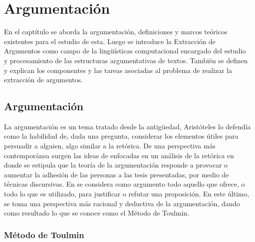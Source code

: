 \chapter{Argumentación}\label{chapter:argumentation}

En el captítulo se aborda la argumentación, definiciones y marcos teóricos existentes para el estudio de esta.
Luego se introduce la Extracción de Argumentos como campo de la lingüísticas computacional encargado del estudio 
y procesamiento de las estructuras argumentativas de textos. También se definen y explican los componentes y las tareas 
asociadas al problema de realizar la extracción de argumentos.

\section{Argumentación}

La argumentación es un tema tratado desde la antigüedad, Aristóteles lo defendía como la 
habilidad de, dada una pregunta, considerar los elementos útiles para persuadir a alguien, algo
similar a la retórica. De una perspectiva más contemporánea surgen las ideas de 
\textcite{perelman1969rhetoric}
enfocadas en un análisis de la retórica en donde se estipula que la teoría de la argumentación
responde a provocar o aumentar la adhesión de las personas a las tesis presentadas, por medio de 
técnicas discursivas. En 
\textcite{toulmin_2003}
se considera como argumento todo aquello que ofrece, 
o todo lo que es utilizado, para justificar o refutar una proposición. En este último, se toma 
una perspectiva más racional y deductiva de la argumentación, dando como resultado lo que se 
conoce como el Método de Toulmin. 

\subsection{Método de Toulmin}

